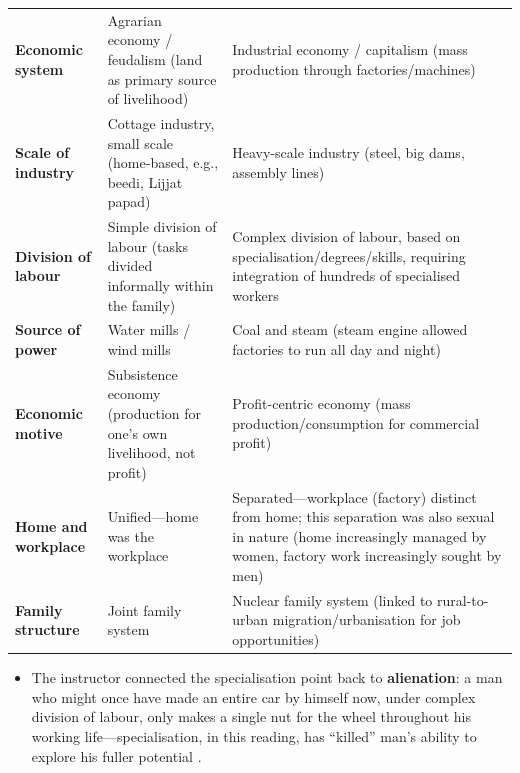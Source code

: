 \vspace{6pt}
\noindent
\begin{tabularx}{\textwidth}{p{3.2cm} Y Y}
\toprule
{}
 &  &  \\
\midrule
\textbf{Economic system} & Agrarian economy / feudalism (land as primary source of livelihood) & Industrial economy / capitalism (mass production through factories/machines)  \\
\textbf{Scale of industry} & Cottage industry, small scale (home-based, e.g., beedi, Lijjat papad) & Heavy-scale industry (steel, big dams, assembly lines)  \\
\textbf{Division of labour} & Simple division of labour (tasks divided informally within the family) & Complex division of labour, based on specialisation/degrees/skills, requiring integration of hundreds of specialised workers  \\
\textbf{Source of power} & Water mills / wind mills & Coal and steam (steam engine allowed factories to run all day and night)  \\
\textbf{Economic motive} & Subsistence economy (production for one's own livelihood, not profit) & Profit-centric economy (mass production/consumption for commercial profit)  \\
\textbf{Home and workplace} & Unified---home was the workplace & Separated---workplace (factory) distinct from home; this separation was also sexual in nature (home increasingly managed by women, factory work increasingly sought by men)  \\
\textbf{Family structure} & Joint family system & Nuclear family system (linked to rural-to-urban migration/urbanisation for job opportunities)  \\
\bottomrule
\end{tabularx}
\vspace{6pt}

\begin{CriticalPoint}
\begin{itemize}
    \item The instructor connected the specialisation point back to \textbf{alienation}: a man who might once have made an entire car by himself now, under complex division of labour, only makes a single nut for the wheel throughout his working life---specialisation, in this reading, has ``killed'' man's ability to explore his fuller potential .
\end{itemize}
\end{CriticalPoint}

